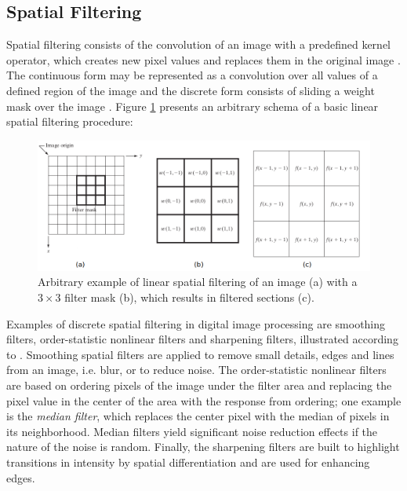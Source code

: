 \subsection{Spatial Filtering}

Spatial filtering consists of the convolution of an image with a predefined kernel operator, which creates new pixel values and replaces them in the original image \cite{gonzalez2018digital}. The continuous form may be represented as a convolution over all values of a defined region of the image and the discrete form consists of sliding a weight mask over the image \cite{wu2008microscope}. Figure \ref{fig:generic_spatial_filtering} presents an arbitrary schema of a basic linear spatial filtering procedure:

\begin{figure}[htb]
	\centering
	\caption{\label{fig:generic_spatial_filtering} Arbitrary example of linear spatial filtering of an image (a) with a $3 \times 3$ filter mask (b), which results in filtered sections (c).} 
	\begin{center}
	    \includegraphics[scale=0.4]{images/generic_spatial_filtering.png}
	\end{center}
	\centering
\end{figure}

Examples of discrete spatial filtering in digital image processing are smoothing filters, order-statistic nonlinear filters and sharpening filters, illustrated according to \cite{gonzalez2018digital}. Smoothing spatial filters are applied to remove small details, edges and lines from an image, i.e. blur, or to reduce noise. The order-statistic nonlinear filters are based on ordering pixels of the image under the filter area and replacing the pixel value in the center of the area with the response from ordering; one example is the \emph{median filter}, which replaces the center pixel with the median of pixels in its neighborhood. Median filters yield significant noise reduction effects if the nature of the noise is random. Finally, the sharpening filters are built to highlight transitions in intensity by spatial differentiation and are used for enhancing edges.

